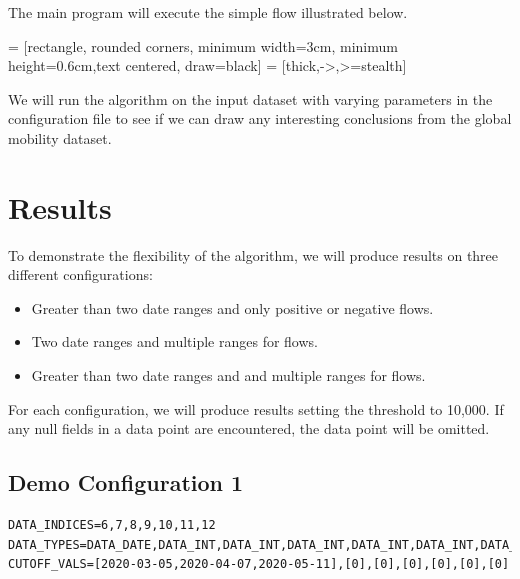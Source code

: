 \documentclass{article}
\begin{document}
\hfill

The main program will execute the simple flow illustrated below.
\begin{center}
 = [rectangle, rounded corners, minimum width=3cm, minimum height=0.6cm,text centered, draw=black]
 = [thick,->,>=stealth]
\end{center}

\hfill

We will run the algorithm on the input dataset with varying parameters in the configuration file to see if we can draw any interesting conclusions from the global mobility dataset.

\section{Results}
To demonstrate the flexibility of the algorithm, we will produce results on three different configurations:
\begin{itemize}
    \item Greater than two date ranges and only positive or negative flows.
    \item Two date ranges and multiple ranges for flows.
    \item Greater than two date ranges and and multiple ranges for flows.
\end{itemize}

For each configuration, we will produce results setting the threshold to 10,000.  If any null fields in a data point are encountered, the data point will be omitted.

\subsection{Demo Configuration 1}
\begin{center}
\footnotesize{
\begin{lstlisting}
DATA_INDICES=6,7,8,9,10,11,12
DATA_TYPES=DATA_DATE,DATA_INT,DATA_INT,DATA_INT,DATA_INT,DATA_INT,DATA_INT
CUTOFF_VALS=[2020-03-05,2020-04-07,2020-05-11],[0],[0],[0],[0],[0],[0]
\end{lstlisting}
}
\end{center}
\end{document}
